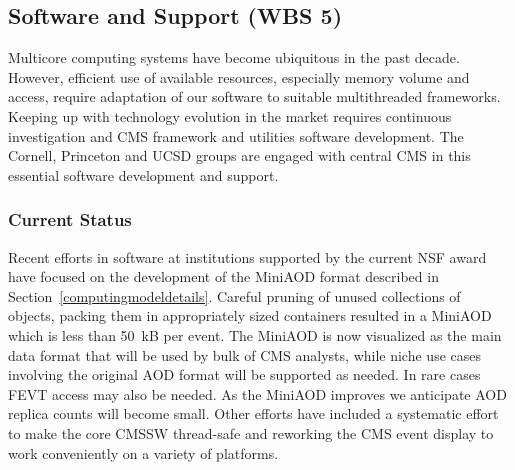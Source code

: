 \documentclass[11pt,a4paper]{article}
\begin{document}
\subsection{Software and Support (WBS 5)}

Multicore computing systems have become ubiquitous in the past
decade. However, efficient use of available resources, especially memory
volume and access, require adaptation of our software to suitable
multithreaded frameworks. Keeping up with technology evolution in the
market requires continuous investigation and CMS framework and utilities
software development.  The Cornell, Princeton and UCSD groups are engaged
with central CMS in this essential software development and support.

\subsubsection{Current Status}

Recent efforts in software at institutions supported by the current NSF award
have focused on the development of the MiniAOD format described in
Section~\ref{computingmodeldetails}.  Careful pruning of unused collections
of objects, packing them in appropriately sized containers resulted in
a MiniAOD which is less than 50~kB per event. The MiniAOD is now
visualized as the main data format that will be used by bulk of CMS
analysts, while niche use cases involving the original AOD format will be
supported as needed. In rare cases FEVT access may also be needed.  As the
MiniAOD improves we anticipate AOD replica counts will become small.  Other
efforts have included a systematic effort to make the core CMSSW
thread-safe and reworking the CMS event display to work conveniently on a
variety of platforms.






\end{document}
